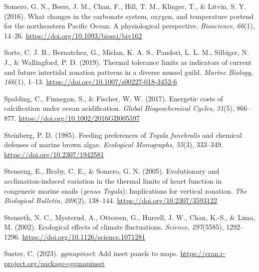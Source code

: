 \documentclass{CSUNthesis}
\begin{document}
Somero, G. N., Beers, J. M., Chan, F., Hill, T. M., Klinger, T., \& Litvin, S. Y. (2016). What changes in the carbonate system, oxygen, and temperature portend for the northeastern Pacific Ocean: A physiological perspective. \textit{Bioscience}, \textit{66}(1), 14--26. \url{https://doi.org/10.1093/biosci/biv162}

\vspace{0.1em}

Sorte, C. J. B., Bernatchez, G., Mislan, K. A. S., Pandori, L. L. M., Silbiger, N. J., \& Wallingford, P. D. (2019). Thermal tolerance limits as indicators of current and future intertidal zonation patterns in a diverse mussel guild. \textit{Marine Biology}, \textit{166}(1), 1--13. \url{https://doi.org/10.1007/s00227-018-3452-6}

\vspace{0.1em}

Spalding, C., Finnegan, S., \& Fischer, W. W. (2017). Energetic costs of calcification under ocean acidification. \textit{Global Biogeochemical Cycles}, \textit{31}(5), 866--877. \url{https://doi.org/10.1002/2016GB005597}

\vspace{0.1em}

Steinberg, P. D. (1985). Feeding preferences of \textit{Tegula funebralis} and chemical defenses of marine brown algae. \textit{Ecological Monographs}, \textit{55}(3), 333--349. \url{https://doi.org/10.2307/1942581}

\vspace{0.1em}

\vspace{0.1em}

Stenseng, E., Braby, C. E., \& Somero, G. N. (2005). Evolutionary and acclimation-induced variation in the thermal limits of heart function in congeneric marine snails (\textit{genus Tegula}): Implications for vertical zonation. \textit{The Biological Bulletin}, \textit{208}(2), 138--144. \url{https://doi.org/10.2307/3593122}

\vspace{0.1em}

Stenseth, N. C., Mysterud, A., Ottersen, G., Hurrell, J. W., Chan, K.-S., \& Lima, M. (2002). Ecological effects of climate fluctuations. \textit{Science}, \textit{297}(5585), 1292--1296. \url{https://doi.org/10.1126/science.1071281}

\vspace{0.1em}

Suster, C. (2023). \textit{ggmapinset}: Add inset panels to maps. \url{https://cran.r-project.org/package=ggmapinset}
\end{document}
